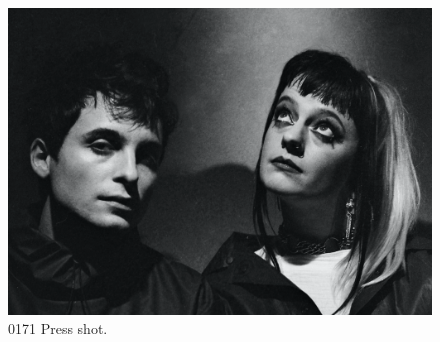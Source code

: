 \begin{figure}[!htb]
    \centering
    \captionsetup{justification=centering}
    \includegraphics[width=1\textwidth]{figures/c7_impact/0171/press/0171-press-shot.png}
    \caption{0171 Press shot.}
    \label{fig:c7:0171-press-shot}
\end{figure}

